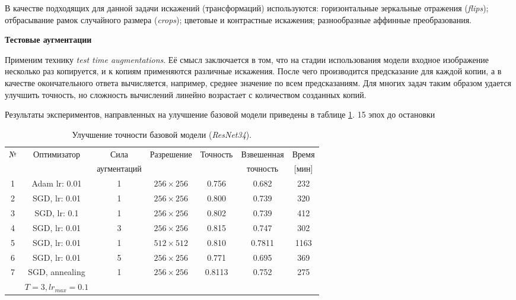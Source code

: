     
В качестве подходящих для данной задачи
искажений (трансформаций) используются:
горизонтальные зеркальные отражения (\textit{flips});
отбрасывание рамок случайного размера (\textit{crops});
цветовые и контрастные искажения;
разнообразные аффинные преобразования.
    
\indent
\textbf{Тестовые аугментации}

\indent
Применим технику \textit{test time augmentations}. 
Её смысл заключается в том, что на стадии использования модели
входное изображение
несколько раз копируется, и к копиям применяются различные 
искажения. После чего производится предсказание для каждой
копии, а в качестве окончательного ответа вычисляется, например, 
среднее значение по всем предсказаниям. Для многих задач таким образом
удается улучшить точность, но сложность вычислений линейно возрастает
с количеством созданных копий.

Результаты экспериментов, направленных на улучшение базовой модели
приведены в таблице \ref{tabular: train_tricks}. 15 эпох до остановки

\begin{table}[h]
    \begin{center}
        \begin{tabular}{c | c| c | c | c| c| c}
            \hline
            № & Оптимизатор & Сила & Разрешение & Точность & Взвешенная  & Время \\
            & & аугментаций & & & точность & [мин] \\
            \hline
    
           1 & Adam lr: 0.01 & 1 & $256 \times 256$ & 0.756 & 0.682 & 232 \\
           
           2 & SGD, lr: 0.01 & 1 & $256 \times 256 $ & 0.800 & 0.739 & 320 \\
           
           3 & SGD, lr: 0.1 & 1 & $256 \times 256 $ & 0.802 & 0.739 & 412 \\
           
           4 & SGD, lr: 0.01 & 3 & $256 \times 256 $ & 0.815 & 0.747 & 302 \\
           
           5 & SGD, lr: 0.01 & 1 & $512 \times 512 $ & 0.810 & 0.7811 & 1163 \\
               
           6 & SGD, lr: 0.01 & 5 & $256 \times 256$ & 0.771 & 0.695 & 369 \\
           
           7 & SGD, annealing & 1 & $256 \times 256$ & 0.8113 & 0.752 & 275 \\
            &  $T=3, lr_{max} = 0.1$ & & & & \\
           
            \hline
        \end{tabular}
    \end{center}
    \caption{Улучшение точности базовой модели (\textit{ResNet34}).}
    \label{tabular: train_tricks}
\end{table}



